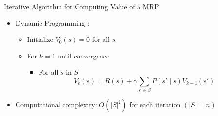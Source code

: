 \documentclass[aspectratio=169]{../latex_main/tntbeamer}  %
\begin{document}
\begin{frame}[c]{Iterative Algorithm for Computing Value of a MRP}

\begin{itemize}
	\item Dynamic Programming :
	\begin{itemize}
	\item Initialize $V_0(s) = 0$ for all $s$
	\item For $k=1$ until convergence
	\begin{itemize}
		\item For all $s$ in $S$
		$$V_k(s) = R(s) + \gamma \sum_{s' \in S} P(s' \mid s) V_{k-1}(s')$$
	\end{itemize}
	\end{itemize}

	\pause
	\smallskip
	\item Computational complexity: $O(|S|^2 )$ for each iteration $(|S| = n)$
\end{itemize}

\end{frame}
\end{document}
